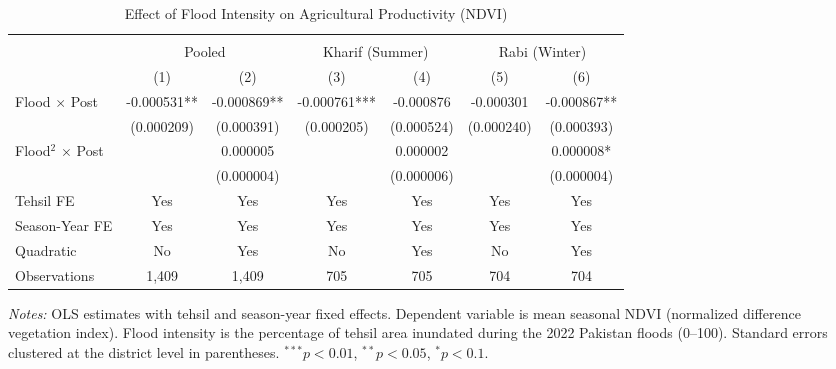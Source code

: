 \begin{table}[htbp]
\centering
\caption{Effect of Flood Intensity on Agricultural Productivity (NDVI)}
\label{tab:main}
\small
\begin{adjustbox}{max width=\textwidth}
\begin{tabular}{lcccccc}
\hline\hline
\\[-1.8ex]
 & \multicolumn{2}{c}{Pooled} & \multicolumn{2}{c}{Kharif (Summer)} & \multicolumn{2}{c}{Rabi (Winter)} \\
\cmidrule(lr){2-3} \cmidrule(lr){4-5} \cmidrule(lr){6-7}
 & (1) & (2) & (3) & (4) & (5) & (6) \\
\hline
Flood $\times$ Post & -0.000531** & -0.000869** & -0.000761*** & -0.000876 & -0.000301 & -0.000867** \\
 & (0.000209) & (0.000391) & (0.000205) & (0.000524) & (0.000240) & (0.000393) \\
Flood$^2$ $\times$ Post &  & 0.000005 &  & 0.000002 &  & 0.000008* \\
 &  & (0.000004) &  & (0.000006) &  & (0.000004) \\
\hline
Tehsil FE & Yes & Yes & Yes & Yes & Yes & Yes \\
Season-Year FE & Yes & Yes & Yes & Yes & Yes & Yes \\
Quadratic & No & Yes & No & Yes & No & Yes \\
Observations & 1,409 & 1,409 & 705 & 705 & 704 & 704 \\
\hline\hline
\end{tabular}
\end{adjustbox}
\par\vspace{0.3em}
\small
\textit{Notes:} OLS estimates with tehsil and season-year fixed effects. Dependent variable is mean seasonal NDVI (normalized difference vegetation index). Flood intensity is the percentage of tehsil area inundated during the 2022 Pakistan floods (0--100). Standard errors clustered at the district level in parentheses. $^{***}p<0.01$, $^{**}p<0.05$, $^{*}p<0.1$.

\end{table}
